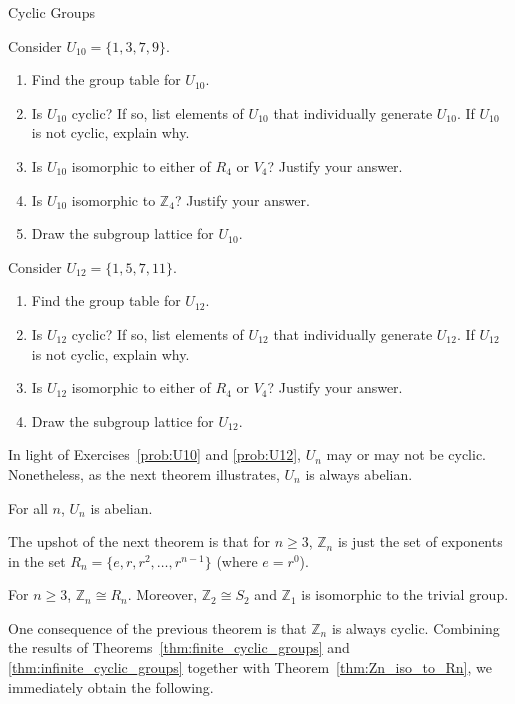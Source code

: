 \begin{section}{Cyclic Groups}
\begin{problem}\label{prob:U10}
Consider $U_{10}=\{1,3,7,9\}$.
\begin{enumerate}[label=\rm{(\alph*)}]
\item Find the group table for $U_{10}$.
\item Is $U_{10}$ cyclic? If so, list elements of $U_{10}$ that individually generate $U_{10}$.  If $U_{10}$ is not cyclic, explain why.
\item Is $U_{10}$ isomorphic to either of $R_4$ or $V_4$? Justify your answer.
\item Is $U_{10}$ isomorphic to $\mathbb{Z}_4$? Justify your answer.
\item Draw the subgroup lattice for $U_{10}$.
\end{enumerate}
\end{problem}

\begin{problem}\label{prob:U12}
Consider $U_{12}=\{1,5,7,11\}$.
\begin{enumerate}[label=\rm{(\alph*)}]
\item Find the group table for $U_{12}$.
\item Is $U_{12}$ cyclic? If so, list elements of $U_{12}$ that individually generate $U_{12}$.  If $U_{12}$ is not cyclic, explain why.
\item Is $U_{12}$ isomorphic to either of $R_4$ or $V_4$? Justify your answer.
\item Draw the subgroup lattice for $U_{12}$.
\end{enumerate}
\end{problem}

In light of Exercises~\ref{prob:U10} and \ref{prob:U12}, $U_n$ may or may not be cyclic. Nonetheless, as the next theorem illustrates, $U_n$ is always abelian.

\begin{theorem}
For all $n$, $U_n$ is abelian.
\end{theorem}

The upshot of the next theorem is that for $n\geq 3$, $\mathbb{Z}_n$ is just the set of exponents in the set $R_n=\{e,r,r^2,\ldots,r^{n-1}\}$ (where $e=r^0$).

\begin{theorem}\label{thm:Zn_iso_to_Rn}
For $n\geq 3$, $\mathbb{Z}_n\cong R_n$. Moreover, $\mathbb{Z}_2\cong S_2$ and $\mathbb{Z}_1$ is isomorphic to the trivial group.
\end{theorem}

One consequence of the previous theorem is that $\mathbb{Z}_n$ is always cyclic. Combining the results of Theorems~\ref{thm:finite_cyclic_groups} and \ref{thm:infinite_cyclic_groups} together with Theorem~\ref{thm:Zn_iso_to_Rn}, we immediately obtain the following.


\end{section}

